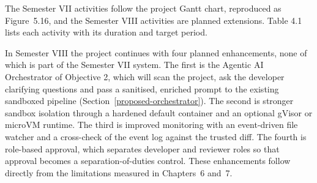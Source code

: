 \documentclass[12pt,a4paper,oneside]{report}
\begin{document}
The Semester VII activities follow the project Gantt chart, reproduced as Figure~5.16, and the Semester VIII activities are planned extensions. Table 4.1 lists each activity with its duration and target period.

In Semester VIII the project continues with four planned enhancements, none of which is part of the Semester VII system. The first is the Agentic AI Orchestrator of Objective 2, which will scan the project, ask the developer clarifying questions and pass a sanitised, enriched prompt to the existing sandboxed pipeline (Section~\ref{proposed-orchestrator}). The second is stronger sandbox isolation through a hardened default container and an optional gVisor or microVM runtime. The third is improved monitoring with an event-driven file watcher and a cross-check of the event log against the trusted diff. The fourth is role-based approval, which separates developer and reviewer roles so that approval becomes a separation-of-duties control. These enhancements follow directly from the limitations measured in Chapters~6 and~7.
\end{document}
